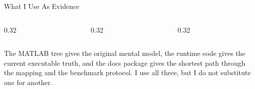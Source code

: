 \documentclass[aspectratio=169,10pt]{beamer}
\begin{document}
\begin{frame}{What I Use As Evidence}
\small
\begin{columns}[T,totalwidth=\textwidth]
\begin{column}{0.32\textwidth}
\end{column}
\begin{column}{0.32\textwidth}
\end{column}
\begin{column}{0.32\textwidth}
\end{column}
\end{columns}
\vspace{0.22cm}
\begin{softbox}
The MATLAB tree gives the original mental model, the runtime code gives the current executable truth, and the docs package gives the shortest path through the mapping and the benchmark protocol. I use all three, but I do not substitute one for another.
\end{softbox}
\end{frame}

\end{document}
